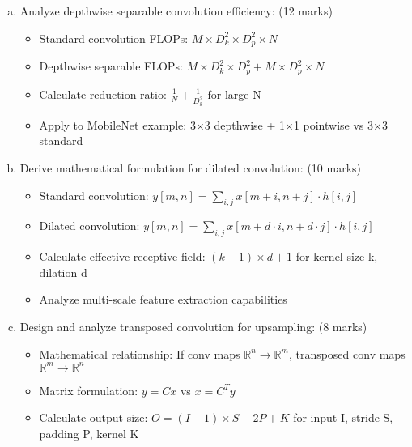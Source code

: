 \documentclass[12pt]{article}
\newcommand{\shortanswer}{\vspace{2cm}}
\newcommand{\mediumanswer}{\vspace{3cm}}
\newcommand{\journalspace}{\vspace{4.5cm}}
\begin{document}
\begin{enumerate}[(a)]
    \item Analyze depthwise separable convolution efficiency: \hfill (12 marks)
    \begin{itemize}
        \item Standard convolution FLOPs: $M \times D_k^2 \times D_p^2 \times N$
        \item Depthwise separable FLOPs: $M \times D_k^2 \times D_p^2 + M \times D_p^2 \times N$
        \item Calculate reduction ratio: $\frac{1}{N} + \frac{1}{D_k^2}$ for large N
        \item Apply to MobileNet example: 3×3 depthwise + 1×1 pointwise vs 3×3 standard
    \end{itemize}
    
    \journalspace
    
    \item Derive mathematical formulation for dilated convolution: \hfill (10 marks)
    \begin{itemize}
        \item Standard convolution: $y[m,n] = \sum_{i,j} x[m+i, n+j] \cdot h[i,j]$
        \item Dilated convolution: $y[m,n] = \sum_{i,j} x[m+d \cdot i, n+d \cdot j] \cdot h[i,j]$
        \item Calculate effective receptive field: $(k-1) \times d + 1$ for kernel size k, dilation d
        \item Analyze multi-scale feature extraction capabilities
    \end{itemize}
    
    \mediumanswer
    
    \item Design and analyze transposed convolution for upsampling: \hfill (8 marks)
    \begin{itemize}
        \item Mathematical relationship: If conv maps $\mathbb{R}^n \rightarrow \mathbb{R}^m$, transposed conv maps $\mathbb{R}^m \rightarrow \mathbb{R}^n$
        \item Matrix formulation: $y = Cx$ vs $x = C^T y$
        \item Calculate output size: $O = (I-1) \times S - 2P + K$ for input I, stride S, padding P, kernel K
    \end{itemize}
    
    \shortanswer
\end{enumerate}
\end{document}
